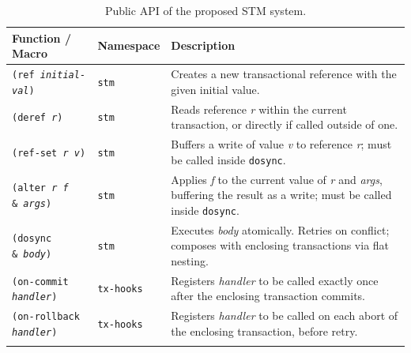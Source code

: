 \begin{table}[H]
  \centering
  \renewcommand{\arraystretch}{1.4}
  \begin{tabularx}{\textwidth}{@{} l l X @{}}
    \toprule
    \textbf{Function / Macro} & \textbf{Namespace}                                                       & \textbf{Description} \\
    \midrule
    \texttt{(ref \textit{initial-val})}
                              & \texttt{stm}
                              & Creates a new transactional reference with the given initial value.                             \\
    \texttt{(deref \textit{r})}
                              & \texttt{stm}
                              & Reads reference \textit{r} within the current transaction, or directly
    if called outside of one.                                                                                                   \\
    \texttt{(ref-set \textit{r} \textit{v})}
                              & \texttt{stm}
                              & Buffers a write of value \textit{v} to reference \textit{r};
    must be called inside \texttt{dosync}.                                                                                      \\
    \texttt{(alter \textit{r} \textit{f} \&\ \textit{args})}
                              & \texttt{stm}
                              & Applies \textit{f} to the current value of \textit{r} and \textit{args},
    buffering the result as a write; must be called inside \texttt{dosync}.                                                     \\
    \texttt{(dosync \&\ \textit{body})}
                              & \texttt{stm}
                              & Executes \textit{body} atomically. Retries on conflict; composes with
    enclosing transactions via flat nesting.                                                                                    \\
    \texttt{(on-commit \textit{handler})}
                              & \texttt{tx-hooks}
                              & Registers \textit{handler} to be called exactly once after the
    enclosing transaction commits.                                                                                              \\
    \texttt{(on-rollback \textit{handler})}
                              & \texttt{tx-hooks}
                              & Registers \textit{handler} to be called on each abort of the
    enclosing transaction, before retry.                                                                                        \\                                                         \\
    \bottomrule
  \end{tabularx}
  \caption{Public API of the proposed STM system.}
  \label{tab:public-api}
\end{table}

